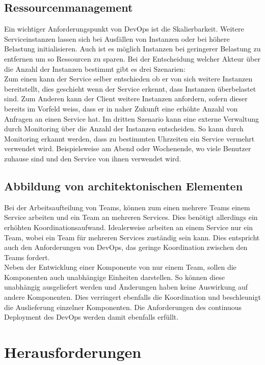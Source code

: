 \subsection{Ressourcenmanagement}

Ein wichtiger Anforderungspunkt von DevOps ist die Skalierbarkeit. Weitere Serviceinstanzen lassen sich bei Ausfällen von Instanzen oder bei höhere Belastung initialisieren. Auch ist es möglich Instanzen bei geringerer Belastung zu entfernen um so Ressourcen zu sparen. Bei der Entscheidung welcher Akteur über die Anzahl der Instanzen bestimmt gibt es drei Szenarien:\\
Zum einen kann der Service selber entschieden ob er von sich weitere Instanzen bereitstellt, dies geschieht wenn der Service erkennt, dass Instanzen überbelastet sind. Zum Anderen kann der Client weitere Instanzen anfordern, sofern dieser bereits im Vorfeld weiss, dass er in naher Zukunft eine erhöhte Anzahl von Anfragen an einen Service hat. Im dritten Szenario kann eine externe Verwaltung durch Monitoring über die Anzahl der Instanzen entscheiden. So kann durch Monitoring erkannt werden, dass zu bestimmten Uhrzeiten ein Service vermehrt verwendet wird. Beispielsweise am Abend oder Wochenende, wo viele Benutzer zuhause sind und den Service von ihnen verwendet wird. 

\subsection{Abbildung von architektonischen Elementen}

Bei der Arbeitsaufteilung von Teams, können zum einen mehrere Teams  einem Service arbeiten und ein Team an mehreren Services. Dies benötigt allerdings ein erhöhten Koordinationsaufwand. Idealerweise arbeiten an einem Service nur ein Team, wobei ein Team für mehreren Services zuständig sein kann. Dies entspricht auch den Anforderungen von DevOps, das geringe Koordination zwischen den Teams fordert.\\

Neben der Entwicklung einer Komponente von nur einem Team, sollen die Komponenten auch unabhängige Einheiten darstellen. So können diese unabhängig ausgeliefert werden und Änderungen haben keine Auswirkung auf andere Komponenten. Dies verringert ebenfalls die Koordination und beschleunigt die Auslieferung einzelner Komponenten. Die Anforderungen des continuous Deployment des DevOps werden damit ebenfalls erfüllt. 


\section{Herausforderungen}

